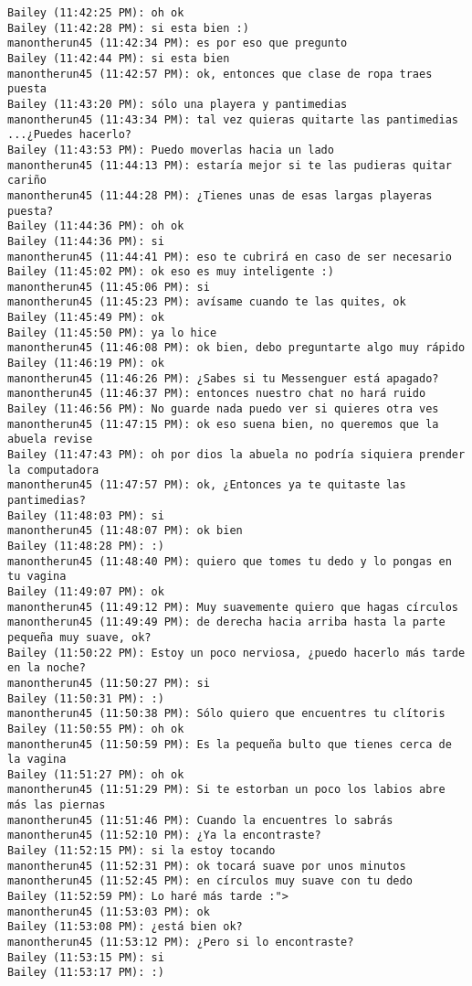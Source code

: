 \begin{verbatim}
Bailey (11:42:25 PM): oh ok
Bailey (11:42:28 PM): si esta bien :)
manontherun45 (11:42:34 PM): es por eso que pregunto
Bailey (11:42:44 PM): si esta bien
manontherun45 (11:42:57 PM): ok, entonces que clase de ropa traes puesta
Bailey (11:43:20 PM): sólo una playera y pantimedias
manontherun45 (11:43:34 PM): tal vez quieras quitarte las pantimedias ...¿Puedes hacerlo?
Bailey (11:43:53 PM): Puedo moverlas hacia un lado
manontherun45 (11:44:13 PM): estaría mejor si te las pudieras quitar cariño
manontherun45 (11:44:28 PM): ¿Tienes unas de esas largas playeras puesta?
Bailey (11:44:36 PM): oh ok
Bailey (11:44:36 PM): si
manontherun45 (11:44:41 PM): eso te cubrirá en caso de ser necesario
Bailey (11:45:02 PM): ok eso es muy inteligente :)
manontherun45 (11:45:06 PM): si
manontherun45 (11:45:23 PM): avísame cuando te las quites, ok
Bailey (11:45:49 PM): ok
Bailey (11:45:50 PM): ya lo hice
manontherun45 (11:46:08 PM): ok bien, debo preguntarte algo muy rápido
Bailey (11:46:19 PM): ok
manontherun45 (11:46:26 PM): ¿Sabes si tu Messenguer está apagado?
manontherun45 (11:46:37 PM): entonces nuestro chat no hará ruido
Bailey (11:46:56 PM): No guarde nada puedo ver si quieres otra ves
manontherun45 (11:47:15 PM): ok eso suena bien, no queremos que la abuela revise
Bailey (11:47:43 PM): oh por dios la abuela no podría siquiera prender la computadora
manontherun45 (11:47:57 PM): ok, ¿Entonces ya te quitaste las pantimedias?
Bailey (11:48:03 PM): si
manontherun45 (11:48:07 PM): ok bien
Bailey (11:48:28 PM): :)
manontherun45 (11:48:40 PM): quiero que tomes tu dedo y lo pongas en tu vagina
Bailey (11:49:07 PM): ok
manontherun45 (11:49:12 PM): Muy suavemente quiero que hagas círculos
manontherun45 (11:49:49 PM): de derecha hacia arriba hasta la parte pequeña muy suave, ok?
Bailey (11:50:22 PM): Estoy un poco nerviosa, ¿puedo hacerlo más tarde en la noche?
manontherun45 (11:50:27 PM): si
Bailey (11:50:31 PM): :)
manontherun45 (11:50:38 PM): Sólo quiero que encuentres tu clítoris 
Bailey (11:50:55 PM): oh ok
manontherun45 (11:50:59 PM): Es la pequeña bulto que tienes cerca de la vagina
Bailey (11:51:27 PM): oh ok
manontherun45 (11:51:29 PM): Si te estorban un poco los labios abre más las piernas
manontherun45 (11:51:46 PM): Cuando la encuentres lo sabrás
manontherun45 (11:52:10 PM): ¿Ya la encontraste?
Bailey (11:52:15 PM): si la estoy tocando
manontherun45 (11:52:31 PM): ok tocará suave por unos minutos
manontherun45 (11:52:45 PM): en círculos muy suave con tu dedo
Bailey (11:52:59 PM): Lo haré más tarde :">
manontherun45 (11:53:03 PM): ok
Bailey (11:53:08 PM): ¿está bien ok?
manontherun45 (11:53:12 PM): ¿Pero si lo encontraste?
Bailey (11:53:15 PM): si
Bailey (11:53:17 PM): :)
\end{verbatim}








